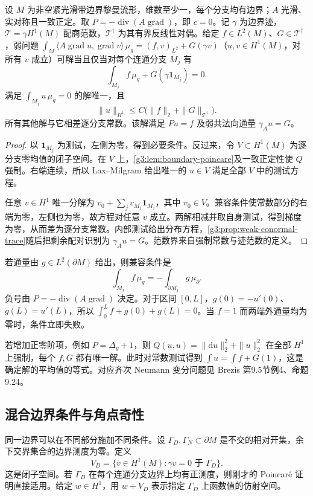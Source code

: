 \begin{theorem}\label{g3:thm:weak-general-neumann}
	设 \(M\) 为非空紧光滑带边界黎曼流形，维数至少一，每个分支均有边界；\(A\) 光滑、实对称且一致正定。取 \(P=-\operatorname{div}(A\operatorname{grad})\)，即 \(c=0\)。记 \(\gamma\) 为边界迹，\(\mathcal T=\gamma H^1(M)\) 配商范数，\(\mathcal T^\dagger\) 为其有界反线性对偶。给定 \(f\in L^2(M)\)、\(G\in\mathcal T^\dagger\)，弱问题 \(\int_M\langle A\operatorname{grad}u,\operatorname{grad}v\rangle\,\mu_g=(f,v)_{L^2}+G(\gamma v)\)（\(u,v\in H^1(M)\)，对所有 \(v\) 成立）可解当且仅当对每个连通分支 \(M_j\) 有
	\begin{equation}\label{g3:eq:neumann-compatibility}
		\int_{M_j}f\,\mu_g+G(\gamma\mathbf1_{M_j})=0.
	\end{equation}
	满足 \(\int_{M_j}u\,\mu_g=0\) 的解唯一，且
	\[
		\|u\|_{H^1}\le C\bigl(\|f\|_2+\|G\|_{\mathcal T^\dagger}\bigr).
	\]
	所有其他解与它相差逐分支常数。该解满足 \(Pu=f\) 及弱共法向通量 \(\gamma_Au=G\)。
\end{theorem}
\begin{proof}
	以 \(\mathbf1_{M_j}\) 为测试，左侧为零，得到必要条件。反过来，令 \(V\subset H^1(M)\) 为逐分支零均值的闭子空间。在 \(V\) 上，\cref{g3:lem:boundary-poincare}及一致正定性使 \(Q\) 强制。右端连续，所以 Lax--Milgram 给出唯一的 \(u\in V\) 满足全部 \(V\) 中的测试方程。

	任意 \(v\in H^1\) 唯一分解为 \(v_0+\sum_jv_{M_j}\mathbf1_{M_j}\)，其中 \(v_0\in V\)。兼容条件使常数部分的右端为零，左侧也为零，故方程对任意 \(v\) 成立。两解相减并取自身测试，得到梯度为零，从而差为逐分支常数。内部测试给出分布方程，\cref{g3:prop:weak-conormal-trace}随后把剩余配对识别为 \(\gamma_Au=G\)。范数界来自强制常数与迹范数的定义。
\end{proof}

若通量由 \(g\in L^2(\partial M)\) 给出，则兼容条件是
\[
	\int_{M_j}f\,\mu_g=-\int_{\partial M_j}g\,\mu_{\partial}.
\]
负号由 \(P=-\operatorname{div}(A\operatorname{grad})\) 决定。对于区间 \([0,L]\)，\(g(0)=-u'(0)\)、\(g(L)=u'(L)\)，所以 \(\int_0^Lf+g(0)+g(L)=0\)。当 \(f=1\) 而两端外通量均为零时，条件立即失败。

\ProseParagraphBreak

若增加正零阶项，例如 \(P=\Delta_g+1\)，则 \(Q(u,u)=\|\mathrm du\|_2^2+\|u\|_2^2\) 在全部 \(H^1\) 上强制，每个 \(f,G\) 都有唯一解。此时对常数测试得到 \(\int u=\int f+G(1)\)，这是确定解的平均值的等式。对应齐次 Neumann 变分问题见 Brezis 第9.5节例4、命题9.24\cite[第9.5节例4，命题9.24]{Brezis2011}。

\subsection{混合边界条件与角点奇性}
\label{g3:subsec:1401:04}
同一边界可以在不同部分施加不同条件。设 \(\Gamma_D,\Gamma_N\subset\partial M\) 是不交的相对开集，余下交界集合的边界测度为零。定义
\[
	V_D=\{v\in H^1(M):\gamma v=0\text{ 于 }\Gamma_D\}.
\]
这是闭子空间。若 \(\Gamma_D\) 在每个连通分支边界上均有正测度，则刚才的 Poincaré 证明直接适用。给定 \(w\in H^1\)，用 \(w+V_D\) 表示指定 \(\Gamma_D\) 上函数值的仿射空间。


